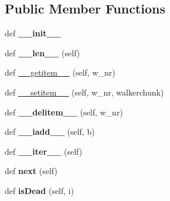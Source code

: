 \subsection*{Public Member Functions}
\begin{DoxyCompactItemize}
\item 
\hypertarget{classWalkerArray_1_1WalkerArray_af3e34fe4e1ddbf10ae58ed2e91546ef9}{}def {\bfseries \+\_\+\+\_\+init\+\_\+\+\_\+}\label{classWalkerArray_1_1WalkerArray_af3e34fe4e1ddbf10ae58ed2e91546ef9}

\item 
\hypertarget{classWalkerArray_1_1WalkerArray_a9c190ccf18e87217897f738c9038d66f}{}def {\bfseries \+\_\+\+\_\+len\+\_\+\+\_\+} (self)\label{classWalkerArray_1_1WalkerArray_a9c190ccf18e87217897f738c9038d66f}

\item 
def \hyperlink{classWalkerArray_1_1WalkerArray_aad8362e7b5a2d09f8d56d6891b83dc0b}{\+\_\+\+\_\+getitem\+\_\+\+\_\+} (self, w\+\_\+nr)
\item 
def \hyperlink{classWalkerArray_1_1WalkerArray_ad39e8b48f5616e0d63bec85a1a0efbfd}{\+\_\+\+\_\+setitem\+\_\+\+\_\+} (self, w\+\_\+nr, walkerchunk)
\item 
\hypertarget{classWalkerArray_1_1WalkerArray_a4c7b10f4f2ac19edf93257f24ca06baa}{}def {\bfseries \+\_\+\+\_\+delitem\+\_\+\+\_\+} (self, w\+\_\+nr)\label{classWalkerArray_1_1WalkerArray_a4c7b10f4f2ac19edf93257f24ca06baa}

\item 
\hypertarget{classWalkerArray_1_1WalkerArray_a2cf49570a0d3cfcfaeb2ece5f32188a5}{}def {\bfseries \+\_\+\+\_\+iadd\+\_\+\+\_\+} (self, b)\label{classWalkerArray_1_1WalkerArray_a2cf49570a0d3cfcfaeb2ece5f32188a5}

\item 
\hypertarget{classWalkerArray_1_1WalkerArray_ab2024738a722dd16227992b88702dd55}{}def {\bfseries \+\_\+\+\_\+iter\+\_\+\+\_\+} (self)\label{classWalkerArray_1_1WalkerArray_ab2024738a722dd16227992b88702dd55}

\item 
\hypertarget{classWalkerArray_1_1WalkerArray_a2e3ef2dc8e62dc6aa7aeb2056b43ea4c}{}def {\bfseries next} (self)\label{classWalkerArray_1_1WalkerArray_a2e3ef2dc8e62dc6aa7aeb2056b43ea4c}

\item 
\hypertarget{classWalkerArray_1_1WalkerArray_aa2aaccf461903ff4e436ab5d91e5d831}{}def {\bfseries is\+Dead} (self, i)\label{classWalkerArray_1_1WalkerArray_aa2aaccf461903ff4e436ab5d91e5d831}


\end{DoxyCompactItemize}
